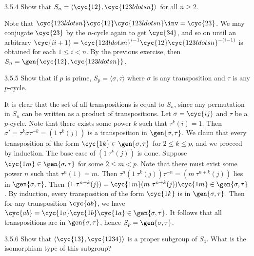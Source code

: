 \begin{exercise}{3.5.4}
    Show that $S_n=\langle \cyc{1 2},\cyc{1 2 3 ldots n}\rangle$ for all $n\ge2$.
\end{exercise}

\begin{sol}
    Note that $\cyc{1 2 3 ldots n}\cyc{1 2}\cyc{1 2 3 ldots n}\inv = \cyc{2 3}$.
	We may conjugate $\cyc{2 3}$ by the $n$-cycle again to get $\cyc{3 4}$, and so on until an arbitrary $\cyc{i i + 1} = \cyc{1 2 3 ldots n}^{i - 1}\cyc{1 2}\cyc{1 2 3 ldots n}^{-(i - 1)}$ is obtained for each $1 \leq i < n$.
	By the previous exercise, then $S_n = \gen{\cyc{1 2}, \cyc{1 2 3 ldots n}}$.
\end{sol}

\begin{exercise}{3.5.5}
    Show that if $p$ is prime, $S_p=\langle \sigma,\tau\rangle$ where $\sigma$ is any transposition and $\tau$ is any $p$-cycle.
\end{exercise}

\begin{sol}
    It is clear that the set of all transpositions is equal to $S_n$, since any permutation in $S_n$ can be written as a product of transpositions.
	Let $\sigma = \cyc{i j}$ and $\tau$ be a $p$-cycle.
	Note that there exists some power $k$ such that $\tau^k(i) = 1$.
	Then $\sigma' = \tau^k\sigma\tau^{-k} = (1\ \tau^k(j))$ is a transposition in $\gen{\sigma, \tau}$.
	We claim that every transposition of the form $\cyc{1 k} \in \gen{\sigma, \tau}$ for $2 \leq k \leq p$, and we proceed by induction.
	The base case of $(1\ \tau^k(j))$ is done.
	Suppose $\cyc{1 m} \in \gen{\sigma, \tau}$ for some $2 \leq m < p$.
	Note that there must exist some power $n$ such that $\tau^n(1) = m$.
	Then $\tau^n(1\ \tau^k(j))\tau^{-n} = (m\ \tau^{n + k}(j))$ lies in $\gen{\sigma, \tau}$.
	Then $(1\ \tau^{n + k}(j)) = \cyc{1 m}(m\ \tau^{n + k}(j))\cyc{1 m} \in \gen{\sigma, \tau}$.
	By induction, every transposition of the form $\cyc{1 k}$ is in $\gen{\sigma, \tau}$.
	Then for any transposition $\cyc{a b}$, we have $\cyc{a b} = \cyc{1 a}\cyc{1 b}\cyc{1 a} \in \gen{\sigma, \tau}$.
	It follows that all transpositions are in $\gen{\sigma, \tau}$, hence $S_p = \gen{\sigma, \tau}$.
\end{sol}

\begin{exercise}{3.5.6}
    Show that $\langle \cyc{1 3},\cyc{1 2 3 4}\rangle$ is a proper subgroup of $S_4$.
	What is the isomorphism type of this subgroup?
\end{exercise}

